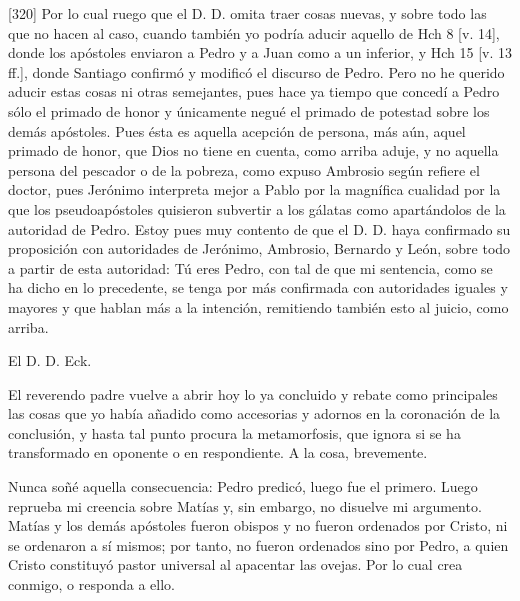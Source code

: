 [320] Por lo cual ruego que el D. D. omita traer cosas nuevas, y sobre todo las que no hacen al caso, cuando también yo podría aducir aquello de Hch 8 [v. 14], donde los apóstoles enviaron a Pedro y a Juan como a un inferior, y Hch 15 [v. 13 ff.], donde Santiago confirmó y modificó el discurso de Pedro. Pero no he querido aducir estas cosas ni otras semejantes, pues hace ya tiempo que concedí a Pedro sólo el primado de honor y únicamente negué el primado de potestad sobre los demás apóstoles. Pues ésta es aquella acepción de persona, más aún, aquel primado de honor, que Dios no tiene en cuenta, como arriba aduje, y no aquella persona del pescador o de la pobreza, como expuso Ambrosio según refiere el doctor, pues Jerónimo interpreta mejor a Pablo por la magnífica cualidad por la que los pseudoapóstoles quisieron subvertir a los gálatas como apartándolos de la autoridad de Pedro. Estoy pues muy contento de que el D. D. haya confirmado su proposición con autoridades de Jerónimo, Ambrosio, Bernardo y León, sobre todo a partir de esta autoridad: Tú eres Pedro, con tal de que mi sentencia, como se ha dicho en lo precedente, se tenga por más confirmada con autoridades iguales y mayores y que hablan más a la intención, remitiendo también esto al juicio, como arriba.

El D. D. Eck.

El reverendo padre vuelve a abrir hoy lo ya concluido y rebate como principales las cosas que yo había añadido como accesorias y adornos en la coronación de la conclusión, y hasta tal punto procura la metamorfosis, que ignora si se ha transformado en oponente o en respondiente. A la cosa, brevemente.

Nunca soñé aquella consecuencia: Pedro predicó, luego fue el primero. Luego reprueba mi creencia sobre Matías y, sin embargo, no disuelve mi argumento. Matías y los demás apóstoles fueron obispos y no fueron ordenados por Cristo, ni se ordenaron a sí mismos; por tanto, no fueron ordenados sino por Pedro, a quien Cristo constituyó pastor universal al apacentar las ovejas. Por lo cual crea conmigo, o responda a ello.


